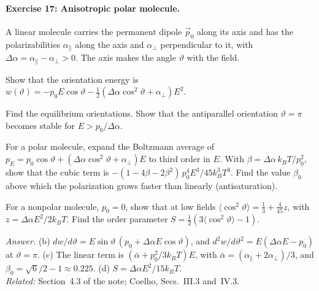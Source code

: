 \documentclass[11pt]{article}      %
\numberwithin{equation}{section}   %
\begin{document}
\paragraph{Exercise 17: Anisotropic polar molecule.}
A linear molecule carries the permanent dipole $\vec p_0$ along its axis and has the polarizabilities $\alpha_\parallel$ along the axis and $\alpha_\perp$ perpendicular to it, with $\Delta\alpha = \alpha_\parallel - \alpha_\perp > 0$. The axis makes the angle $\vartheta$ with the field.
\begin{parts}
    \item Show that the orientation energy is $w(\vartheta) = -p_0E\cos\vartheta - \tfrac12\left(\Delta\alpha\cos^2\vartheta + \alpha_\perp\right)E^2$.
    \item Find the equilibrium orientations. Show that the antiparallel orientation $\vartheta = \pi$ becomes stable for $E > p_0/\Delta\alpha$.
    \item For a polar molecule, expand the Boltzmann average of $p_E = p_0\cos\vartheta + (\Delta\alpha\cos^2\vartheta + \alpha_\perp)E$ to third order in $E$. With $\beta = \Delta\alpha\,k_BT/p_0^2$, show that the cubic term is $-(1 - 4\beta - 2\beta^2)\,p_0^4E^3/45k_B^3T^3$. Find the value $\beta_0$ above which the polarization grows faster than linearly (antisaturation).
    \item For a nonpolar molecule, $p_0 = 0$, show that at low fields $\langle\cos^2\vartheta\rangle = \tfrac13 + \tfrac{4}{45}z$, with $z = \Delta\alpha E^2/2k_BT$. Find the order parameter $S = \tfrac12(3\langle\cos^2\vartheta\rangle - 1)$.
\end{parts}
\textit{Answer.} (b) $dw/d\vartheta = E\sin\vartheta\,(p_0 + \Delta\alpha E\cos\vartheta)$, and $d^2w/d\vartheta^2 = E(\Delta\alpha E - p_0)$ at $\vartheta = \pi$. (c) The linear term is $\left(\bar\alpha + p_0^2/3k_BT\right)E$, with $\bar\alpha = (\alpha_\parallel + 2\alpha_\perp)/3$, and $\beta_0 = \sqrt6/2 - 1 \approx 0.225$. (d) $S = \Delta\alpha E^2/15k_BT$.\\
\textit{Related:} Section~4.3 of the note; Coelho, Secs.~III.3 and~IV.3.
\end{document}
